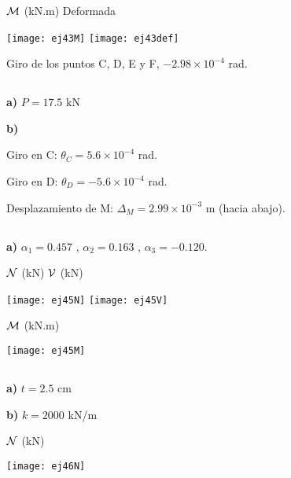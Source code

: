 ${\mathcal M}$ (kN.m) \hspace{0.4\textwidth} Deformada
\begin{center}
	\texttt{[image: ej43M]}
	\texttt{[image: ej43def]}
\end{center}


Giro de los puntos C, D, E y F, $-2.98 \times 10^{-4}$ rad.


\subsection{}

\textbf{a)} $P = 17.5$ kN

\textbf{b)}

Giro en C: $\theta_C = 5.6 \times 10^{-4}$ rad.

Giro en D: $\theta_D = -5.6 \times 10^{-4}$ rad.

Desplazamiento de M: $\Delta_M = 2.99 \times 10^{-3}$ m (hacia abajo).


\subsection{}

\textbf{a)} $\alpha_1 = 0.457$ , $\alpha_2 = 0.163$ , $\alpha_3 = -0.120$.

${\mathcal N}$ (kN) \hspace{0.4\textwidth} ${\mathcal V}$ (kN)

\begin{center}
	\texttt{[image: ej45N]}
	\texttt{[image: ej45V]}
\end{center}

${\mathcal M}$ (kN.m)

\begin{center}
	\texttt{[image: ej45M]}
\end{center}


\subsection{}

\textbf{a)} $t = 2.5$ cm

\textbf{b)} $k = 2000$ kN/m


${\mathcal N}$ (kN)
\begin{center}
	\texttt{[image: ej46N]}
\end{center}


